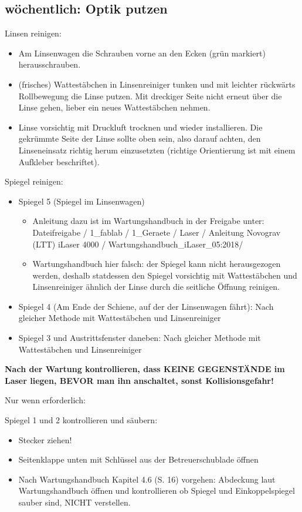 \documentclass{\basedir/fablab-document}
\begin{document}
	\subsection{wöchentlich: Optik putzen}

	Linsen reinigen:
	\begin{itemize}
		\item Am Linsenwagen die Schrauben vorne an den Ecken (grün markiert) herausschrauben.
		\item (frisches) Wattestäbchen in Linsenreiniger tunken und mit leichter rückwärts Rollbewegung die Linse putzen. Mit dreckiger Seite nicht erneut über die Linse gehen, lieber ein neues Wattestäbchen nehmen.
		\item Linse vorsichtig mit Druckluft trocknen und wieder installieren. Die gekrümmte Seite der Linse sollte oben sein, also darauf achten, den Linseneinsatz richtig herum einzusetzten (richtige Orientierung ist mit einem Aufkleber beschriftet).
	\end{itemize}

	Spiegel reinigen:
	\begin{itemize}
		\item Spiegel 5 (Spiegel im Linsenwagen)
		\begin{itemize}
			\item 	Anleitung dazu ist im Wartungshandbuch in der Freigabe unter: Dateifreigabe / 1\_fablab / 1\_Geraete / Laser / Anleitung Novograv (LTT) iLaser 4000 / Wartungshandbuch\_iLaser\_05:2018/
			\item 	Wartungshandbuch hier falsch: der Spiegel kann nicht herausgezogen werden, deshalb statdessen den Spiegel vorsichtig mit Wattestäbchen und Linsenreiniger ähnlich der Linse durch die seitliche Öffnung reinigen.
		\end{itemize}
		\item Spiegel 4 (Am Ende der Schiene, auf der der Linsenwagen fährt): Nach gleicher Methode mit Wattestäbchen und Linsenreiniger
		\item Spiegel 3 und Austrittsfenster daneben: Nach gleicher Methode mit Wattestäbchen und Linsenreiniger
	\end{itemize}

\textbf{Nach der Wartung kontrollieren, dass KEINE GEGENSTÄNDE im Laser liegen, BEVOR man ihn anschaltet, sonst Kollisionsgefahr!}

	Nur wenn erforderlich:

	Spiegel 1 und 2 kontrollieren und säubern:
	\begin{itemize}
		\item Stecker ziehen!
		\item Seitenklappe unten mit Schlüssel aus der Betreuerschublade öffnen
		\item Nach Wartungshandbuch Kapitel 4.6 (S. 16) vorgehen: Abdeckung laut Wartungshandbuch öffnen und kontrollieren ob Spiegel und Einkoppelspiegel sauber sind, NICHT verstellen.
	\end{itemize}
\end{document}
